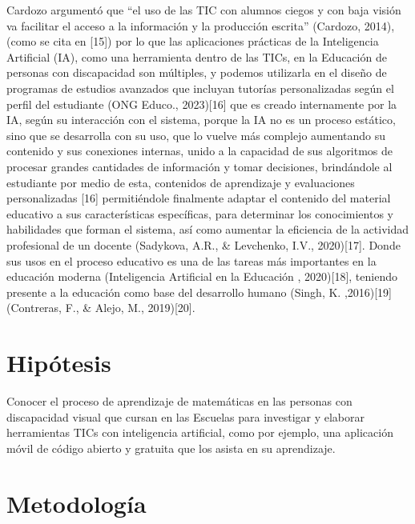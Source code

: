 \documentclass{article}
\begin{document}
{\changefontsizes{8.8pt}
Cardozo argumentó que “el uso de las TIC con alumnos ciegos y con baja visión va facilitar el acceso a la  información y la producción escrita” (Cardozo, 2014), (como se cita en [15]) por lo que las aplicaciones prácticas de la Inteligencia Artificial (IA), como una herramienta dentro de las TICs, en la Educación de personas con discapacidad son múltiples, y podemos utilizarla en el diseño de programas de estudios avanzados que incluyan tutorías personalizadas según el perfil del estudiante (ONG Educo., 2023)[16] que es creado internamente por la IA, según su interacción con el sistema, porque la IA no es un proceso estático, sino que se desarrolla con su uso, que lo vuelve más complejo aumentando su contenido y sus conexiones internas, unido a la capacidad de sus algoritmos de procesar grandes cantidades de información y tomar decisiones, brindándole al estudiante por medio de esta, contenidos de aprendizaje y evaluaciones personalizadas [16] permitiéndole finalmente adaptar el contenido del material educativo a sus características específicas, para determinar los conocimientos y habilidades que forman el sistema, así como aumentar la eficiencia de la actividad profesional de un docente (Sadykova, A.R., \& Levchenko, I.V., 2020)[17]. Donde sus usos en el proceso educativo es una de las tareas más importantes en la educación moderna (Inteligencia Artificial en la Educación , 2020)[18], teniendo presente a la educación como base del desarrollo humano (Singh, K. ,2016)[19] (Contreras, F., \& Alejo, M., 2019)[20]. 
}

\section{\fontsize{12pt}{14pt} Hipótesis}

{\changefontsizes{8.8pt}
Conocer el proceso de aprendizaje de matemáticas en las personas con discapacidad visual que cursan en las Escuelas para investigar y elaborar herramientas TICs con inteligencia artificial, como por ejemplo, una aplicación móvil de código abierto y gratuita que los asista en su aprendizaje.
}

\section{\fontsize{12pt}{14pt} Metodología}
\end{document}
